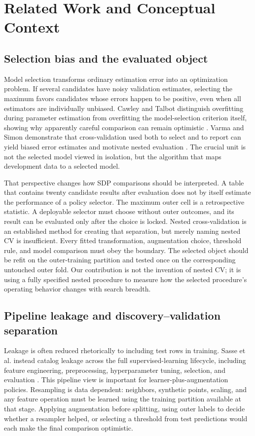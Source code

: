 \documentclass[referee]{USG}
\begin{document}
\section{Related Work and Conceptual Context}
\subsection{Selection bias and the evaluated object}
Model selection transforms ordinary estimation error into an optimization problem. If several candidates have noisy validation estimates, selecting the maximum favors candidates whose errors happen to be positive, even when all estimators are individually unbiased. Cawley and Talbot distinguish overfitting during parameter estimation from overfitting the model-selection criterion itself, showing why apparently careful comparison can remain optimistic \cite{cawley2010overfitting}. Varma and Simon demonstrate that cross-validation used both to select and to report can yield biased error estimates and motivate nested evaluation \cite{varma2006bias}. The crucial unit is not the selected model viewed in isolation, but the algorithm that maps development data to a selected model.

That perspective changes how SDP comparisons should be interpreted. A table that contains twenty candidate results after evaluation does not by itself estimate the performance of a policy selector. The maximum outer cell is a retrospective statistic. A deployable selector must choose without outer outcomes, and its result can be evaluated only after the choice is locked. Nested cross-validation is an established method for creating that separation, but merely naming nested CV is insufficient. Every fitted transformation, augmentation choice, threshold rule, and model comparison must obey the boundary. The selected object should be refit on the outer-training partition and tested once on the corresponding untouched outer fold. Our contribution is not the invention of nested CV; it is using a fully specified nested procedure to measure how the selected procedure's operating behavior changes with search breadth.

\subsection{Pipeline leakage and discovery--validation separation}
Leakage is often reduced rhetorically to including test rows in training. Sasse et al. instead catalog leakage across the full supervised-learning lifecycle, including feature engineering, preprocessing, hyperparameter tuning, selection, and evaluation \cite{sasse2025leakage}. This pipeline view is important for learner-plus-augmentation policies. Resampling is data dependent: neighbors, synthetic points, scaling, and any feature operation must be learned using the training partition available at that stage. Applying augmentation before splitting, using outer labels to decide whether a resampler helped, or selecting a threshold from test predictions would each make the final comparison optimistic.
\end{document}
